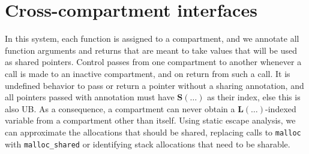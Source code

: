 \documentclass{article}
\begin{document}
\section{Cross-compartment interfaces}

In this system, each function is assigned to a compartment, and we annotate all function arguments
and returns that are meant to take values that will be used as shared pointers. Control passes
from one compartment to another whenever a call is made to an inactive compartment, and on return
from such a call. It is undefined behavior to pass or return a pointer without a sharing annotation,
and all pointers passed with annotation must have \(\mathbf{S}(\dots)\) as their index, else this
is also UB. As a consequence, a compartment can never obtain a \(\mathbf{L}(\dots)\)-indexed variable
from a compartment other than itself. Using static escape analysis, we can approximate the allocations
that should be shared, replacing calls to {\tt malloc} with {\tt malloc\_shared} or identifying
stack allocations that need to be sharable.
\end{document}
